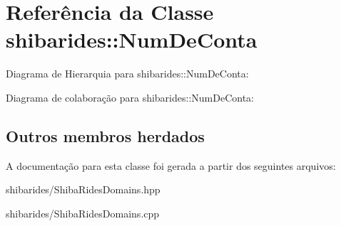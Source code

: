 \hypertarget{classshibarides_1_1NumDeConta}{}\section{Referência da Classe shibarides\+:\+:Num\+De\+Conta}
\label{classshibarides_1_1NumDeConta}


Diagrama de Hierarquia para shibarides\+:\+:Num\+De\+Conta\+:


Diagrama de colaboração para shibarides\+:\+:Num\+De\+Conta\+:
\subsection*{Outros membros herdados}


A documentação para esta classe foi gerada a partir dos seguintes arquivos\+:\begin{DoxyCompactItemize}
\item 
shibarides/Shiba\+Rides\+Domains.\+hpp\item 
shibarides/Shiba\+Rides\+Domains.\+cpp\end{DoxyCompactItemize}
